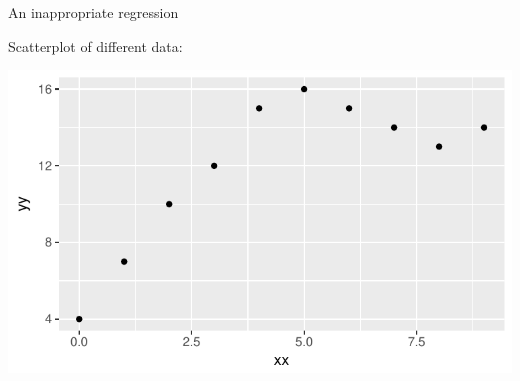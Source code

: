 \begin{frame}[fragile]{An inappropriate regression}

Scatterplot of different data:  
  
{\footnotesize
 
\begin{knitrout}
\color{fgcolor}\begin{kframe}
\begin{alltt}
\hlkwb{=}\hlstd{(}\hlstd{,}
\hlstd{(}\hlopt{+}\hlstd{()}
\end{alltt}
\end{kframe}
\includegraphics[width=\maxwidth]{figure/curvy-1} 

\end{knitrout}
}  
  



\end{frame}

